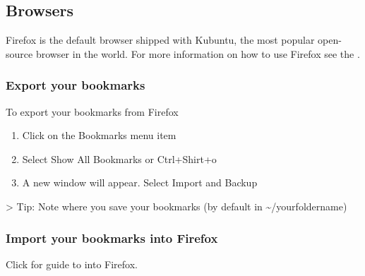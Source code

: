 \documentclass[letterpaper,10pt,english]{sphinxmanual}
\begin{document}
\subsection{Browsers}
\label{\detokenize{docs/software:browsers}}
Firefox is the default browser shipped with Kubuntu, the most popular open-source browser in the world. For more information on how to use Firefox see the .


\subsubsection{Export your bookmarks}
\label{\detokenize{docs/software:export-your-bookmarks}}
To export your bookmarks from Firefox
\begin{enumerate}
\item {} 
Click on the Bookmarks menu item

\item {} 
Select Show All Bookmarks or Ctrl+Shirt+o

\item {} 
A new window will appear. Select Import and Backup

\end{enumerate}

\textgreater{} Tip: Note where you save your bookmarks (by default in \textasciitilde{}/yourfoldername)


\subsubsection{Import your bookmarks into Firefox}
\label{\detokenize{docs/software:import-your-bookmarks-into-firefox}}
Click for guide to  into Firefox.
\end{document}
